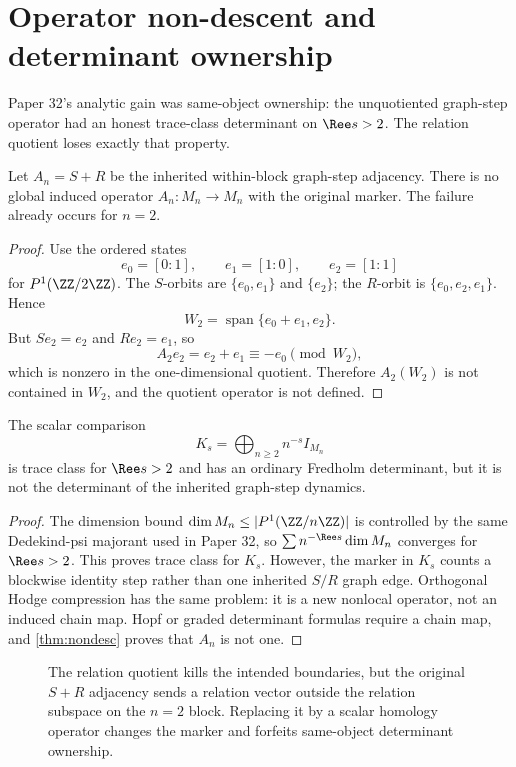 \section{Operator non-descent and determinant ownership}
\label{sec:operator}

Paper 32's analytic gain was same-object ownership: the unquotiented
graph-step operator had an honest trace-class determinant on $\Ree s>2$.  The
relation quotient loses exactly that property.

\begin{theorem}
\label{thm:nondesc}
Let $A_n=S+R$ be the inherited within-block graph-step adjacency.  There is no
global induced operator $A_n:M_n\to M_n$ with the original marker.  The failure
already occurs for $n=2$.
\end{theorem}

\begin{proof}
Use the ordered states
\[
  e_0=[0:1],\qquad e_1=[1:0],\qquad e_2=[1:1]
\]
for $P^1(\ZZ/2\ZZ)$.  The $S$-orbits are $\{e_0,e_1\}$ and $\{e_2\}$; the
$R$-orbit is $\{e_0,e_2,e_1\}$.  Hence
\[
  W_2=\operatorname{span}\{e_0+e_1,e_2\}.
\]
But $S e_2=e_2$ and $R e_2=e_1$, so
\[
  A_2e_2=e_2+e_1\equiv -e_0\pmod{W_2},
\]
which is nonzero in the one-dimensional quotient.  Therefore $A_2(W_2)$ is
not contained in $W_2$, and the quotient operator is not defined.
\end{proof}

\begin{corollary}
\label{cor:scalar}
The scalar comparison
\[
  K_s=\bigoplus_{n\ge2} n^{-s} I_{M_n}
\]
is trace class for $\Ree s>2$ and has an ordinary Fredholm determinant, but it
is not the determinant of the inherited graph-step dynamics.
\end{corollary}

\begin{proof}
The dimension bound $\dim M_n\le |P^1(\ZZ/n\ZZ)|$ is controlled by the same
Dedekind-psi majorant used in Paper 32, so $\sum n^{-\Ree s}\dim M_n$
converges for $\Ree s>2$.  This proves trace class for $K_s$.  However, the
marker in $K_s$ counts a blockwise identity step rather than one inherited
$S/R$ graph edge.  Orthogonal Hodge compression has the same problem: it is a
new nonlocal operator, not an induced chain map.  Hopf or graded determinant
formulas require a chain map, and \cref{thm:nondesc} proves that $A_n$ is not
one.
\end{proof}

\begin{figure}[t]
  \centering
  
  \caption{The relation quotient kills the intended boundaries, but the
  original $S+R$ adjacency sends a relation vector outside the relation
  subspace on the $n=2$ block.  Replacing it by a scalar homology operator
  changes the marker and forfeits same-object determinant ownership.}
  \label{fig:operator}
\end{figure}
